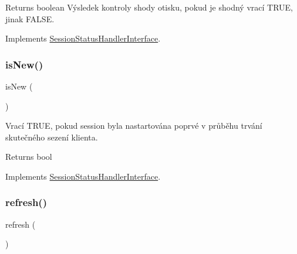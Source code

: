 \begin{DoxyReturn}{Returns}
boolean Výsledek kontroly shody otisku, pokud je shodný vrací T\+R\+UE, jinak F\+A\+L\+SE. 
\end{DoxyReturn}


Implements \mbox{\hyperlink{interface_pes_1_1_session_1_1_session_status_handler_interface}{Session\+Status\+Handler\+Interface}}.

\mbox{\label{class_pes_1_1_session_1_1_session_status_handler_ad5305cbf1b1f253e8bef4b2c478dacb0}} 
\subsubsection{\texorpdfstring{is\+New()}{isNew()}}
{\footnotesize\ttfamily is\+New (\begin{DoxyParamCaption}{ }\end{DoxyParamCaption})}

Vrací T\+R\+UE, pokud session byla nastartována poprvé v průběhu trvání skutečného sezení klienta.

\begin{DoxyReturn}{Returns}
bool 
\end{DoxyReturn}


Implements \mbox{\hyperlink{interface_pes_1_1_session_1_1_session_status_handler_interface}{Session\+Status\+Handler\+Interface}}.

\mbox{\label{class_pes_1_1_session_1_1_session_status_handler_a2aff0844db6d9b56e6ba96123e1dd11c}} 
\subsubsection{\texorpdfstring{refresh()}{refresh()}}
{\footnotesize\ttfamily refresh (\begin{DoxyParamCaption}{ }\end{DoxyParamCaption})}

